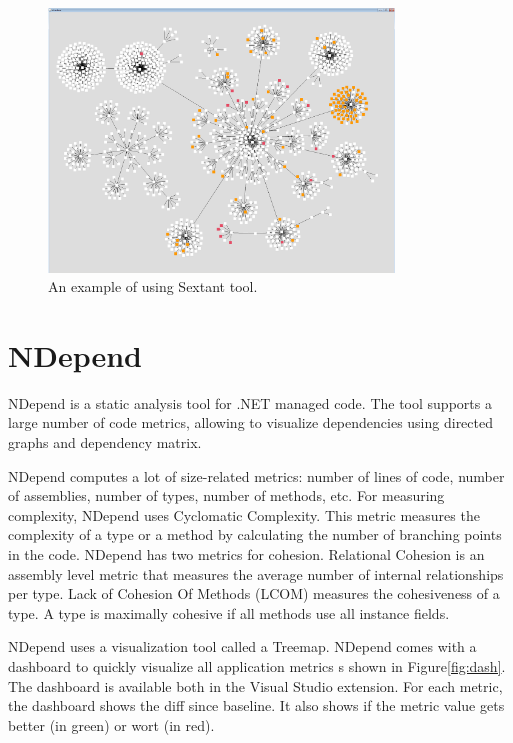 \begin{figure}[h]
	\centering
	\includegraphics[height=70mm]{figures/1.png}
	\caption{An example of using Sextant tool.}
	\label{fig:1}
\end{figure}

\section{NDepend}

NDepend is a static analysis tool for .NET managed code. The tool supports a large number of code metrics, allowing to visualize dependencies using directed graphs and dependency matrix.  

NDepend computes a lot of size-related metrics: number of lines of code, number of assemblies, number of types, number of methods, etc. For measuring complexity, NDepend uses Cyclomatic Complexity. This metric measures the complexity of a type or a method by calculating the number of branching points in the code.
NDepend has two metrics for cohesion. Relational Cohesion is an assembly level metric that measures the average number of internal relationships per type. Lack of Cohesion Of Methods (LCOM) measures the cohesiveness of a type. A type is maximally cohesive if all methods use all instance fields.

NDepend uses a visualization tool called a Treemap.
NDepend comes with a dashboard to quickly visualize all application metrics s shown in Figure\ref{fig:dash}. The dashboard is available both in the Visual Studio extension. For each metric, the dashboard shows the diff since baseline. It also shows if the metric value gets better (in green) or wort (in red). 

